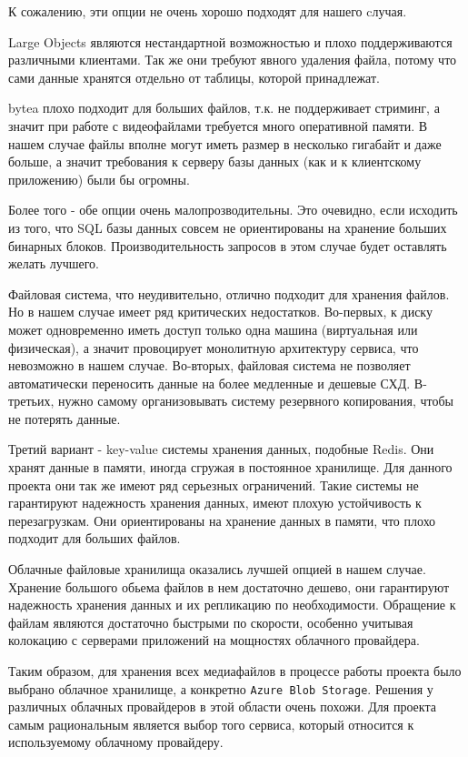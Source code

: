 К сожалению, эти опции не очень хорошо подходят для нашего cлучая.

Large Objects являются нестандартной возможностью и плохо поддерживаются различными клиентами. Так же они требуют явного удаления файла, потому что сами данные хранятся отдельно от таблицы, которой принадлежат.

bytea плохо подходит для больших файлов, т.к. не поддерживает стриминг, а значит при работе с видеофайлами требуется много оперативной памяти. В нашем случае файлы вполне могут иметь размер в несколько гигабайт и даже больше, а значит требования к серверу базы данных (как и к клиентскому приложению) были бы огромны.

Более того - обе опции очень малопрозводительны. Это очевидно, если исходить из того, что SQL базы данных совсем не ориентированы на хранение больших бинарных блоков. Производительность запросов в этом случае будет оставлять желать лучшего.

Файловая система, что неудивительно, отлично подходит для хранения файлов. Но в нашем случае имеет ряд критических недостатков. Во-первых, к диску может одновременно иметь доступ только одна машина (виртуальная или физическая), а значит провоцирует монолитную архитектуру сервиса, что невозможно в нашем случае. Во-вторых, файловая система не позволяет автоматически переносить данные на более медленные и дешевые СХД. В-третьих, нужно самому организовывать систему резервного копирования, чтобы не потерять данные.

Третий вариант - key-value системы хранения данных, подобные Redis. Они хранят данные в памяти, иногда сгружая в постоянное хранилище. Для данного проекта они так же имеют ряд серьезных ограничений. Такие системы не гарантируют надежность хранения данных, имеют плохую устойчивость к перезагрузкам. Они ориентированы на хранение данных в памяти, что плохо подходит для больших файлов.

Облачные файловые хранилища оказались лучшей опцией в нашем случае. Хранение большого обьема файлов в нем достаточно дешево, они гарантируют надежность хранения данных и их репликацию по необходимости. Обращение к файлам являются достаточно быстрыми по скорости, особенно учитывая колокацию с серверами приложений на мощностях облачного провайдера.

Таким образом, для хранения всех медиафайлов в процессе работы проекта было выбрано облачное хранилище, а конкретно \texttt{Azure Blob Storage}. Решения у различных облачных провайдеров в этой области очень похожи. Для проекта самым рациональным является выбор того сервиса, который относится к используемому облачному провайдеру.

